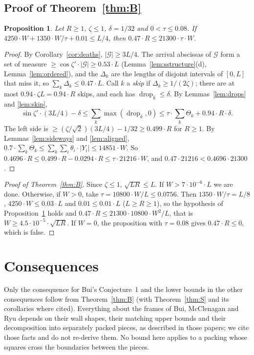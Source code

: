 \documentclass[11pt,letterpaper]{amsart}
\theoremstyle{plain}
\newtheorem{proposition}[theorem]{Proposition}
\theoremstyle{definition}
\theoremstyle{remark}
\begin{document}
\subsection{Proof of Theorem~\ref{thm:B}}\label{sec:proofB}
\begin{proposition}\label{prop:quantitative}
Let $R\ge1$, $\zeta\le1$, $\delta=1/32$ and $0<\tau\le0.08$. If $4250\cdot W+1350\cdot W/\tau+0.01\le L/4$, then $0.47\cdot R\le21300\cdot\tau\cdot W$.
\end{proposition}
\begin{proof}
By Corollary~\ref{cor:deaths}, $|\mathcal G|\ge3L/4$. The arrival abscissas of $\mathcal G$ form a set of measure $\ge\cos\zeta'\cdot|\mathcal G|\ge0.53\cdot L$ (Lemma~\ref{lem:sstructure}(d), Lemma~\ref{lem:ordered}), and the $\Delta_k$ are the lengths of disjoint intervals of $[0,L]$ that miss it, so $\sum_k\Delta_k\le0.47\cdot L$. Call $k$ a \emph{skip} if $\Delta_k\ge1/(2\zeta)$; there are at most $0.94\cdot\zeta L=0.94\cdot R$ skips, and each has $\operatorname{drop}_k\le\delta$. By Lemmas~\ref{lem:drops} and \ref{lem:skip},
\[
\sin\zeta'\cdot(3L/4)-\delta\le\sum_k\max(\operatorname{drop}_k,0)\le\tau\cdot\sum_k\Theta_k+0.94\cdot R\cdot\delta.
\]
The left side is $\ge(\zeta/\sqrt2)(3L/4)-1/32\ge0.499\cdot R$ for $R\ge1$. By Lemmas~\ref{lem:sideways} and \ref{lem:aligned}, $0.7\cdot\sum_k\Theta_k\le\sum_k\sum_i\theta_i\cdot|Y_i|\le14851\cdot W$. So $0.4696\cdot R\le0.499\cdot R-0.0294\cdot R\le\tau\cdot21216\cdot W$, and $0.47\cdot21216<0.4696\cdot21300$.
\end{proof}

\begin{proof}[Proof of Theorem~\ref{thm:B}]
Since $\zeta\le1$, $\sqrt{LR}\le L$. If $W>7\cdot10^{-6}\cdot L$ we are done. Otherwise, if $W>0$, take $\tau=10800\cdot W/L\le0.0756$. Then $1350\cdot W/\tau=L/8$, $4250\cdot W\le0.03\cdot L$ and $0.01\le0.01\cdot L$ ($L\ge R\ge1$), so the hypothesis of Proposition~\ref{prop:quantitative} holds and $0.47\cdot R\le21300\cdot10800\cdot W^2/L$, that is $W\ge4.5\cdot10^{-5}\cdot\sqrt{LR}$. If $W=0$, the proposition with $\tau=0.08$ gives $0.47\cdot R\le0$, which is false.
\end{proof}

\section{Consequences}\label{sec:consequences}
Only the consequence for Bui's Conjecture~1 and the lower bounds in the other consequences follow from Theorem~\ref{thm:B} (with Theorem~\ref{thm:S} and its corollaries where cited). Everything about the frames of Bui, McClenagan and Ryu depends on their wall shapes, their matching upper bounds and their decomposition into separately packed pieces, as described in those papers; we cite those facts and do not re-derive them. No bound here applies to a packing whose squares cross the boundaries between the pieces.
\end{document}
